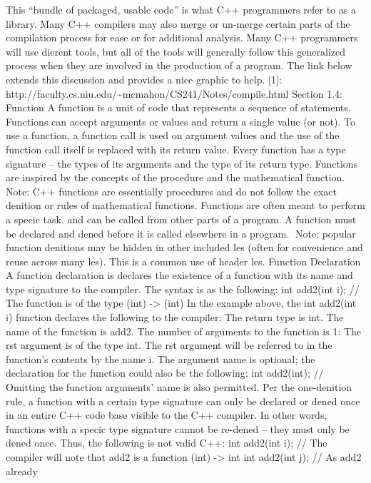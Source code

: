 {This ``bundle of packaged, usable code'' is what C++ programmers refer
to as a library. Many C++ compilers may also merge or un-merge certain
parts of the compilation process for ease or for additional analysis.
Many C++ programmers will use dierent tools, but all of the tools will
generally follow this generalized process when they are involved in the
production of a program. The link below extends this discussion and
provides a nice graphic to help. {[}1{]}:
http://faculty.cs.niu.edu/\textasciitilde mcmahon/CS241/Notes/compile.html
Section 1.4: Function A function is a unit of code that represents a
sequence of statements. Functions can accept arguments or values and
return a single value (or not). To use a function, a function call is
used on argument values and the use of the function call itself is
replaced with its return value. Every function has a type signature --
the types of its arguments and the type of its return type. Functions
are inspired by the concepts of the procedure and the mathematical
function. Note: C++ functions are essentially procedures and do not
follow the exact denition or rules of mathematical functions. Functions
are often meant to perform a specic task. and can be called from other
parts of a program. A function must be declared and dened before it is
called elsewhere in a program. Note: popular function denitions may be
hidden in other included les (often for convenience and reuse across
many les). This is a common use of header les. Function Declaration A
function declaration is declares the existence of a function with its
name and type signature to the compiler. The syntax is as the following:
int add2(int i); // The function is of the type (int) -\textgreater{}
(int) In the example above, the int add2(int i) function declares the
following to the compiler: The return type is int. The name of the
function is add2. The number of arguments to the function is 1: The rst
argument is of the type int. The rst argument will be referred to in the
function's contents by the name i. The argument name is optional; the
declaration for the function could also be the following: int add2(int);
// Omitting the function arguments' name is also permitted. Per the
one-denition rule, a function with a certain type signature can only be
declared or dened once in an entire C++ code base visible to the C++
compiler. In other words, functions with a specic type signature cannot
be re-dened -- they must only be dened once. Thus, the following is not
valid C++: int add2(int i); // The compiler will note that add2 is a
function (int) -\textgreater{} int int add2(int j); // As add2 already
}
